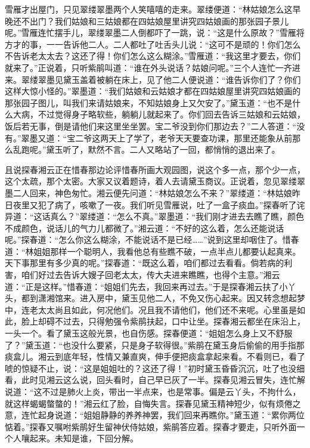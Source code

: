 \begin{parag}
    雪雁才出屋门，只见翠缕翠墨两个人笑嘻嘻的走来。翠缕便道：“林姑娘怎么这早晚还不出门？我们姑娘和三姑娘都在四姑娘屋里讲究四姑娘画的那张园子景儿呢。”雪雁连忙摆手儿，翠缕翠墨二人倒都吓了一跳，说：“这是什么原故？”雪雁将方才的事，一一告诉他二人。二人都吐了吐舌头儿说：“这可不是顽的！你们怎么不告诉老太太去？这还了得！你们怎么这么糊涂。”雪雁道：“我这里才要去，你们就来了。”正说着，只听紫鹃叫道：“谁在外头说话？姑娘问呢。”三个人连忙一齐进来。翠缕翠墨见黛玉盖着被躺在床上，见了他二人便说道：“谁告诉你们了？你们这样大惊小怪的。”翠墨道：“我们姑娘和云姑娘才都在四姑娘屋里讲究四姑娘画的那张园子图儿，叫我们来请姑娘来，不知姑娘身上又欠安了。”黛玉道：“也不是什么大病，不过觉得身子略软些，躺躺儿就起来了。你们回去告诉三姑娘和云姑娘，饭后若无事，倒是请他们来这里坐坐罢。宝二爷没到你们那边去？”二人答道：“没有。”翠墨又道：“宝二爷这两天上了学了，老爷天天要查功课，那里还能象从前那么乱跑呢。”黛玉听了，默然不言。二人又略站了一回，都悄悄的退出来了。
\end{parag}


\begin{parag}
    且说探春湘云正在惜春那边论评惜春所画大观园图，说这个多一点，那个少一点，这个太疏，那个太密。大家又议着题诗，着人去请黛玉商议。正说着，忽见翠缕翠墨二人回来，神色匆忙。湘云便先问道：“林姑娘怎么不来？”翠缕道：“林姑娘昨日夜里又犯了病了，咳嗽了一夜。我们听见雪雁说，吐了一盒子痰血。”探春听了诧异道：“这话真么？”翠缕道：“怎么不真。”翠墨道：“我们刚才进去去瞧了瞧，颜色不成颜色，说话儿的气力儿都微了。”湘云道：“不好的这么着，怎么还能说话呢。”探春道：“怎么你这么糊涂，不能说话不是已经……”说到这里却咽住了。惜春道：“林姐姐那样一个聪明人，我看他总有些瞧不破，一点半点儿都要认起真来。天下事那里有多少真的呢。”探春道：“既这么着，咱们都过去看看。倘若病的利害，咱们好过去告诉大嫂子回老太太，传大夫进来瞧瞧，也得个主意。”湘云道：“正是这样。”惜春道：“姐姐们先去，我回来再过去。”于是探春湘云扶了小丫头，都到潇湘馆来。进入房中，黛玉见他二人，不免又伤心起来。因又转念想起梦中，连老太太尚且如此，何况他们。况且我不请他们，他们还不来呢。心里虽是如此，脸上却碍不过去，只得勉强令紫鹃扶起，口中让坐。探春湘云都坐在床沿上，一头一个。看了黛玉这般光景，也自伤感。探春便道：“姐姐怎么身上又不舒服了？”黛玉道：“也没什么要紧，只是身子软得很。”紫鹃在黛玉身后偷偷的用手指那痰盒儿。湘云到底年轻，性情又兼直爽，伸手便把痰盒拿起来看。不看则已，看了唬的惊疑不止，说：“这是姐姐吐的？这还了得！”初时黛玉昏昏沉沉，吐了也没细看，此时见湘云这么说，回头看时，自己早已灰了一半。探春见湘云冒失，连忙解说道：“这不过是肺火上炎，带出一半点来，也是常事。偏是云丫头，不拘什么，就这样蝎蝎螫螫的！”湘云红了脸，自悔失言。探春见黛玉精神短少，似有烦倦之意，连忙起身说道：“姐姐静静的养养神罢，我们回来再瞧你。”黛玉道：“累你两位惦着。”探春又嘱咐紫鹃好生留神伏侍姑娘，紫鹃答应着。探春才要走，只听外面一个人嚷起来。未知是谁，下回分解。
\end{parag}